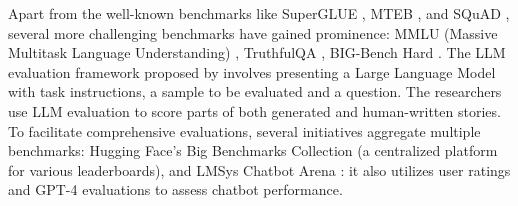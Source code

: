 

Apart from the well-known benchmarks like SuperGLUE \cite{sarlin2020supergluelearningfeaturematching}, MTEB \cite{muennighoff-etal-2023-mteb}, and SQuAD \cite{rajpurkar2016squad100000questionsmachine}, several more challenging benchmarks have gained prominence: MMLU (Massive Multitask Language Understanding) \cite{DBLP:conf/iclr/HendrycksBBZMSS21},  TruthfulQA \cite{lin-etal-2022-truthfulqa}, BIG-Bench Hard \cite{suzgun-etal-2023-challenging}. The LLM evaluation framework proposed by \cite{chiang-lee-2023-large} involves presenting a Large Language Model with task instructions, a sample to be evaluated and a question. The researchers use LLM evaluation to score parts of both generated and human-written stories. %
To facilitate comprehensive evaluations, several initiatives aggregate multiple benchmarks:
Hugging Face's Big Benchmarks Collection (a centralized platform for various leaderboards), and 
LMSys Chatbot Arena \cite{chiang2024chatbot,zheng2023judgingllmasajudgemtbenchchatbot}: it also utilizes user ratings and GPT-4 evaluations to assess chatbot performance.